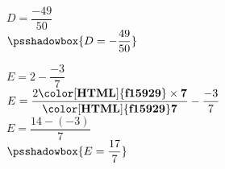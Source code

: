 \begin{corrige}
\begin{multicols}
\begin{list}{}{}
\begin{spacing}{2}
            $D = \dfrac{-49}{50}$ \\
            $\psshadowbox{D = -\dfrac{49}{50}}$ 
            \item $E = 2-\dfrac{-3}{7}$ \\
            $E = \dfrac{2\mathbf{{\color[HTML]{f15929}\times 7}}}{\mathbf{{\color[HTML]{f15929}7}}}-\dfrac{-3}{7}$ \\
            $E = \dfrac{14-(-3)}{7}$ \\
            $\psshadowbox{E = \dfrac{17}{7}}$
            \end{spacing}
        \end{list}
    \end{multicols}
\end{corrige}

